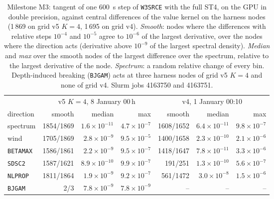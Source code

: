 \documentclass[11pt,a4paper]{article}
\begin{document}
\begin{table}[H]
\centering\small
\begin{tabular}{lrrrrrr}
\toprule
 & \multicolumn{3}{c}{v5 $K=4$, 8 January 00\,h} & \multicolumn{3}{c}{v4, 1 January 00:10} \\
direction & smooth & median & max & smooth & median & max \\
\midrule
spectrum & 1854/1869 & $1.6\times10^{-11}$ & $4.7\times10^{-7}$ & 1608/1652 & $6.4\times10^{-11}$ & $9.8\times10^{-7}$ \\
wind & 1705/1869 & $2.8\times10^{-9}$ & $9.5\times10^{-5}$ & 1400/1658 & $2.3\times10^{-10}$ & $2.1\times10^{-6}$ \\
\texttt{BETAMAX} & 1586/1861 & $2.2\times10^{-9}$ & $9.5\times10^{-7}$ & 1418/1647 & $7.8\times10^{-11}$ & $3.3\times10^{-6}$ \\
\texttt{SDSC2} & 1587/1621 & $8.9\times10^{-10}$ & $9.9\times10^{-7}$ & 191/251 & $1.3\times10^{-10}$ & $5.6\times10^{-7}$ \\
\texttt{NLPROP} & 1811/1864 & $1.9\times10^{-9}$ & $9.2\times10^{-7}$ & 561/1472 & $3.0\times10^{-8}$ & $1.5\times10^{-6}$ \\
\texttt{BJGAM} & 2/3 & $7.8\times10^{-9}$ & $7.8\times10^{-9}$ & -- & -- & -- \\
\bottomrule
\end{tabular}
\caption{Milestone M3: tangent of one \SI{600}{s} step of \texttt{W3SRCE}
with the full ST4, on the GPU in double precision, against central
differences of the value kernel on the harness nodes (1\,869 on grid v5
$K=4$, 1\,695 on grid v4). \emph{Smooth}: nodes where the differences
with relative steps $10^{-4}$ and $10^{-5}$ agree to $10^{-6}$ of the
largest derivative, over the nodes where the direction acts (derivative
above $10^{-9}$ of the largest spectral density). \emph{Median} and
\emph{max} over the smooth nodes of the largest difference over the
spectrum, relative to the largest derivative of the node. \emph{Spectrum}:
a random relative change of every bin. Depth-induced breaking
(\texttt{BJGAM}) acts at three harness nodes of grid v5 $K=4$ and none of
grid v4. Slurm jobs 4163750 and 4163751.}
\label{tab:m3}
\end{table}
\end{document}

